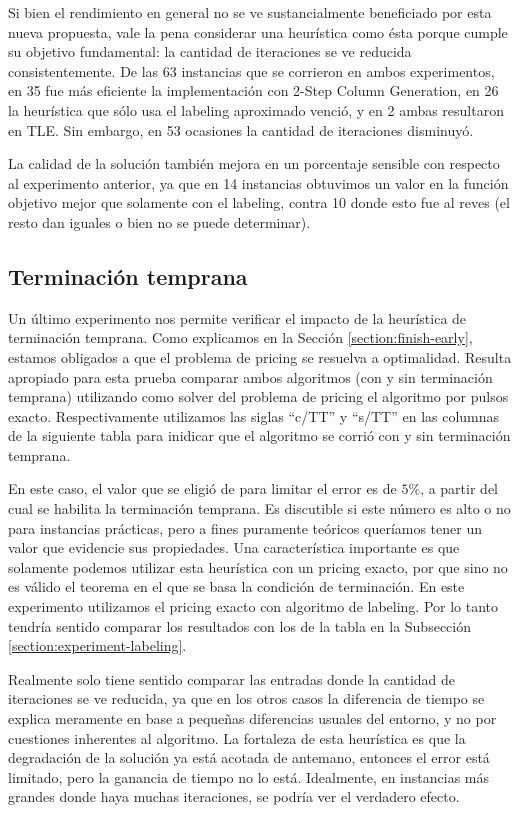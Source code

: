 Si bien el rendimiento en general no se ve sustancialmente beneficiado por esta nueva propuesta, vale la pena considerar una heurística como ésta porque cumple su objetivo fundamental: la cantidad de iteraciones se ve reducida consistentemente. De las 63 instancias que se corrieron en ambos experimentos, en 35 fue más eficiente la implementación con 2-Step Column Generation, en 26 la heurística que sólo usa el labeling aproximado venció, y en 2 ambas resultaron en TLE. Sin embargo, en 53 ocasiones la cantidad de iteraciones disminuyó.

La calidad de la solución también mejora en un porcentaje sensible con respecto al experimento anterior, ya que en 14 instancias obtuvimos un valor en la función objetivo mejor que solamente con el labeling, contra 10 donde esto fue al reves (el resto dan iguales o bien no se puede determinar).


\subsection{Terminación temprana}

Un último experimento nos permite verificar el impacto de la heurística de terminación temprana. Como explicamos en la Sección \ref{section:finish-early}, estamos obligados a que el problema de pricing se resuelva a optimalidad. Resulta apropiado para esta prueba comparar ambos algoritmos (con y sin terminación temprana) utilizando como solver del problema de pricing el algoritmo por pulsos exacto. Respectivamente utilizamos las siglas ``c/TT'' y ``s/TT'' en las columnas de la siguiente tabla para inidicar que el algoritmo se corrió con y sin terminación temprana. 

En este caso, el valor que se eligió de para limitar el error es de $5\%$, a partir del cual se habilita la terminación temprana. Es discutible si este número es alto o no para instancias prácticas, pero a fines puramente teóricos queríamos tener un valor que evidencie sus propiedades. Una característica importante es que solamente podemos utilizar esta heurística con un pricing exacto, por que sino no es válido el teorema en el que se basa la condición de terminación. En este experimento utilizamos el pricing exacto con algoritmo de labeling. Por lo tanto tendría sentido comparar los resultados con los de la tabla en la Subsección \ref{section:experiment-labeling}.

Realmente solo tiene sentido comparar las entradas donde la cantidad de iteraciones se ve reducida, ya que en los otros casos la diferencia de tiempo se explica meramente en base a pequeñas diferencias usuales del entorno, y no por cuestiones inherentes al algoritmo. La fortaleza de esta heurística es que la degradación de la solución ya está acotada de antemano, entonces el error está limitado, pero la ganancia de tiempo no lo está. Idealmente, en instancias más grandes donde haya muchas iteraciones, se podría ver el verdadero efecto.

